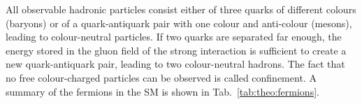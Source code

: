 All observable hadronic particles consist either of three quarks of different colours (baryons) or of a quark-antiquark pair with one colour and anti-colour (mesons), leading to colour-neutral particles. If two quarks are separated far enough, the energy stored in the gluon field of the strong interaction is sufficient to create a new quark-antiquark pair, leading to two colour-neutral hadrons. The fact that no free colour-charged particles can be observed is called confinement. A summary of the fermions in the SM is shown in Tab.~\ref{tab:theo:fermions}.\\

